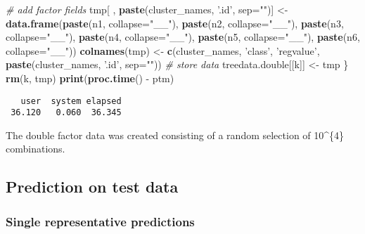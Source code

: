 \documentclass[]{article}
\newenvironment{Shaded}{\begin{snugshade}}{\end{snugshade}}
\newcommand{\KeywordTok}[1]{\textcolor[rgb]{0.13,0.29,0.53}{\textbf{{#1}}}}
\newcommand{\DataTypeTok}[1]{\textcolor[rgb]{0.13,0.29,0.53}{{#1}}}
\newcommand{\StringTok}[1]{\textcolor[rgb]{0.31,0.60,0.02}{{#1}}}
\newcommand{\CommentTok}[1]{\textcolor[rgb]{0.56,0.35,0.01}{\textit{{#1}}}}
\newcommand{\NormalTok}[1]{{#1}}
\begin{document}
\begin{Shaded}
\begin{Highlighting}[]
  \CommentTok{# add factor fields }
  \NormalTok{tmp[ , }\KeywordTok{paste}\NormalTok{(cluster_names, }\StringTok{'.id'}\NormalTok{, }\DataTypeTok{sep=}\StringTok{""}\NormalTok{)] <-}\StringTok{ }\KeywordTok{data.frame}\NormalTok{(}\KeywordTok{paste}\NormalTok{(n1, }\DataTypeTok{collapse=}\StringTok{"__"}\NormalTok{), }
                                              \KeywordTok{paste}\NormalTok{(n2, }\DataTypeTok{collapse=}\StringTok{"__"}\NormalTok{),}
                                              \KeywordTok{paste}\NormalTok{(n3, }\DataTypeTok{collapse=}\StringTok{"__"}\NormalTok{),}
                                              \KeywordTok{paste}\NormalTok{(n4, }\DataTypeTok{collapse=}\StringTok{"__"}\NormalTok{),}
                                              \KeywordTok{paste}\NormalTok{(n5, }\DataTypeTok{collapse=}\StringTok{"__"}\NormalTok{),}
                                              \KeywordTok{paste}\NormalTok{(n6, }\DataTypeTok{collapse=}\StringTok{"__"}\NormalTok{))}
  \KeywordTok{colnames}\NormalTok{(tmp) <-}\StringTok{ }\KeywordTok{c}\NormalTok{(cluster_names, }\StringTok{'class'}\NormalTok{, }\StringTok{'regvalue'}\NormalTok{, }
                     \KeywordTok{paste}\NormalTok{(cluster_names, }\StringTok{'.id'}\NormalTok{, }\DataTypeTok{sep=}\StringTok{""}\NormalTok{))}
  \CommentTok{# store data}
  \NormalTok{treedata.double[[k]] <-}\StringTok{ }\NormalTok{tmp}
\NormalTok{\}}
\KeywordTok{rm}\NormalTok{(k, tmp)}
\KeywordTok{print}\NormalTok{(}\KeywordTok{proc.time}\NormalTok{() -}\StringTok{ }\NormalTok{ptm)}
\end{Highlighting}
\end{Shaded}

\begin{verbatim}
   user  system elapsed 
 36.120   0.060  36.345 
\end{verbatim}

The double factor data was created consisting of a random selection of
10\^{}\{4\} combinations.

\subsection{Prediction on test data}\label{prediction-on-test-data}

\subsubsection{Single representative
predictions}\label{single-representative-predictions}
\end{document}
